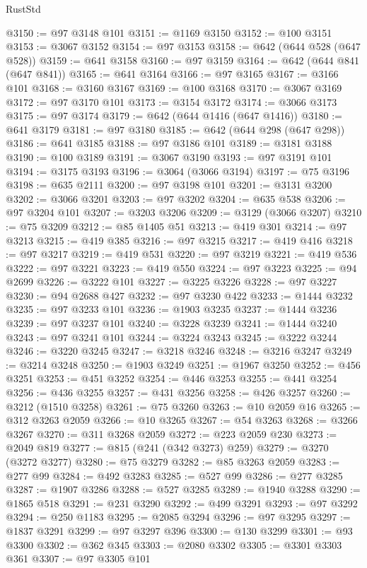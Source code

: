 \begin{lexlean}{RustStd}
\begin{coremodule}
@3150 := @97 @3148 @101
@3151 := @1169 @3150
@3152 := @100 @3151
@3153 := @3067 @3152
@3154 := @97 @3153
@3158 := @642 (@644 @528 (@647 @528))
@3159 := @641 @3158
@3160 := @97 @3159
@3164 := @642 (@644 @841 (@647 @841))
@3165 := @641 @3164
@3166 := @97 @3165
@3167 := @3166 @101
@3168 := @3160 @3167
@3169 := @100 @3168
@3170 := @3067 @3169
@3172 := @97 @3170 @101
@3173 := @3154 @3172
@3174 := @3066 @3173
@3175 := @97 @3174
@3179 := @642 (@644 @1416 (@647 @1416))
@3180 := @641 @3179
@3181 := @97 @3180
@3185 := @642 (@644 @298 (@647 @298))
@3186 := @641 @3185
@3188 := @97 @3186 @101
@3189 := @3181 @3188
@3190 := @100 @3189
@3191 := @3067 @3190
@3193 := @97 @3191 @101
@3194 := @3175 @3193
@3196 := @3064 (@3066 @3194)
@3197 := @75 @3196
@3198 := @635 @2111
@3200 := @97 @3198 @101
@3201 := @3131 @3200
@3202 := @3066 @3201
@3203 := @97 @3202
@3204 := @635 @538
@3206 := @97 @3204 @101
@3207 := @3203 @3206
@3209 := @3129 (@3066 @3207)
@3210 := @75 @3209
@3212 := @85 @1405 @51
@3213 := @419 @301
@3214 := @97 @3213
@3215 := @419 @385
@3216 := @97 @3215
@3217 := @419 @416
@3218 := @97 @3217
@3219 := @419 @531
@3220 := @97 @3219
@3221 := @419 @536
@3222 := @97 @3221
@3223 := @419 @550
@3224 := @97 @3223
@3225 := @94 @2699
@3226 := @3222 @101
@3227 := @3225 @3226
@3228 := @97 @3227
@3230 := @94 @2688 @427
@3232 := @97 @3230 @422
@3233 := @1444 @3232
@3235 := @97 @3233 @101
@3236 := @1903 @3235
@3237 := @1444 @3236
@3239 := @97 @3237 @101
@3240 := @3228 @3239
@3241 := @1444 @3240
@3243 := @97 @3241 @101
@3244 := @3224 @3243
@3245 := @3222 @3244
@3246 := @3220 @3245
@3247 := @3218 @3246
@3248 := @3216 @3247
@3249 := @3214 @3248
@3250 := @1903 @3249
@3251 := @1967 @3250
@3252 := @456 @3251
@3253 := @451 @3252
@3254 := @446 @3253
@3255 := @441 @3254
@3256 := @436 @3255
@3257 := @431 @3256
@3258 := @426 @3257
@3260 := @3212 (@1510 @3258)
@3261 := @75 @3260
@3263 := @10 @2059 @16
@3265 := @312 @3263 @2059
@3266 := @10 @3265
@3267 := @54 @3263
@3268 := @3266 @3267
@3270 := @311 @3268 @2059
@3272 := @223 @2059 @230
@3273 := @2049 @819
@3277 := @815 (@241 (@342 @3273) @259)
@3279 := @3270 (@3272 @3277)
@3280 := @75 @3279
@3282 := @85 @3263 @2059
@3283 := @277 @99
@3284 := @492 @3283
@3285 := @527 @99
@3286 := @277 @3285
@3287 := @1907 @3286
@3288 := @527 @3285
@3289 := @1940 @3288
@3290 := @1865 @518
@3291 := @231 @3290
@3292 := @499 @3291
@3293 := @97 @3292
@3294 := @250 @1183
@3295 := @2085 @3294
@3296 := @97 @3295
@3297 := @1837 @3291
@3299 := @97 @3297 @396
@3300 := @130 @3299
@3301 := @93 @3300
@3302 := @362 @345
@3303 := @2080 @3302
@3305 := @3301 @3303 @361
@3307 := @97 @3305 @101

\end{coremodule}
\end{lexlean}
